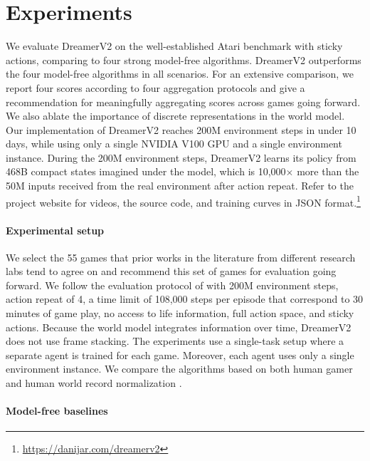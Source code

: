 \section{Experiments}
\label{sec:experiments}

We evaluate DreamerV2 on the well-established Atari benchmark with sticky actions, comparing to four strong model-free algorithms. DreamerV2 outperforms the four model-free algorithms in all scenarios. For an extensive comparison, we report four scores according to four aggregation protocols and give a recommendation for meaningfully aggregating scores across games going forward. We also ablate the importance of discrete representations in the world model. Our implementation of DreamerV2 reaches 200M environment steps in under 10 days, while using only a single NVIDIA V100 GPU and a single environment instance. During the 200M environment steps, DreamerV2 learns its policy from 468B compact states imagined under the model, which is 10,000$\times$ more than the 50M inputs received from the real environment after action repeat. Refer to the project website for videos, the source code, and training curves in JSON format.\footnote{\url{https://danijar.com/dreamerv2}}

\paragraph{Experimental setup}

We select the 55 games that prior works in the literature from different research labs tend to agree on \citep{mnih2016a3c,brockman2016gym,hessel2018rainbow,castro2018dopamine,badia2020agent57} and recommend this set of games for evaluation going forward. We follow the evaluation protocol of \citet{machado2018atariprotocol} with 200M environment steps, action repeat of 4, a time limit of 108,000 steps per episode that correspond to 30 minutes of game play, no access to life information, full action space, and sticky actions. Because the world model integrates information over time, DreamerV2 does not use frame stacking. The experiments use a single-task setup where a separate agent is trained for each game. Moreover, each agent uses only a single environment instance. We compare the algorithms based on both human gamer and human world record normalization \citep{toromanoff2019atarirecords}.

\paragraph{Model-free baselines}

